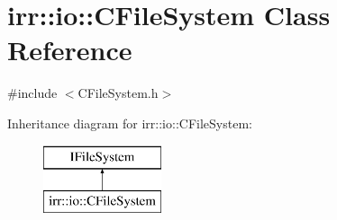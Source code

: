 \hypertarget{classirr_1_1io_1_1_c_file_system}{\section{irr\-:\-:io\-:\-:C\-File\-System Class Reference}
\label{classirr_1_1io_1_1_c_file_system}
}


{\ttfamily \#include $<$C\-File\-System.\-h$>$}

Inheritance diagram for irr\-:\-:io\-:\-:C\-File\-System\-:\begin{figure}[H]
\begin{center}
\leavevmode
\includegraphics[height=2.000000cm]{classirr_1_1io_1_1_c_file_system}
\end{center}
\end{figure}
